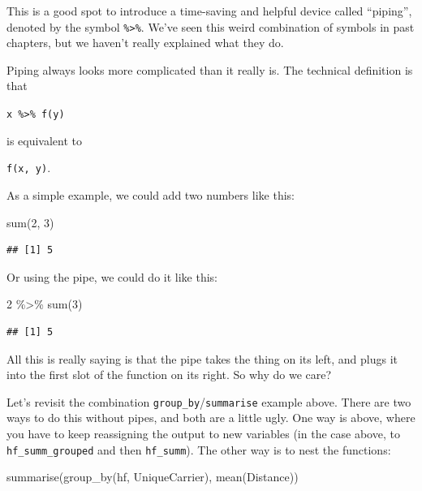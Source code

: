 \documentclass[
]{book}
\newenvironment{Shaded}{\begin{snugshade}}{\end{snugshade}}
\newcommand{\DecValTok}[1]{\textcolor[rgb]{0.00,0.00,0.81}{#1}}
\newcommand{\FunctionTok}[1]{\textcolor[rgb]{0.00,0.00,0.00}{#1}}
\newcommand{\NormalTok}[1]{#1}
\newcommand{\SpecialCharTok}[1]{\textcolor[rgb]{0.00,0.00,0.00}{#1}}
\begin{document}
This is a good spot to introduce a time-saving and helpful device called ``piping'', denoted by the symbol \texttt{\%\textgreater{}\%}. We've seen this weird combination of symbols in past chapters, but we haven't really explained what they do.

Piping always looks more complicated than it really is. The technical definition is that

\texttt{x\ \%\textgreater{}\%\ f(y)}

is equivalent to

\texttt{f(x,\ y)}.

As a simple example, we could add two numbers like this:

\begin{Shaded}
\begin{Highlighting}[]
\FunctionTok{sum}\NormalTok{(}\DecValTok{2}\NormalTok{, }\DecValTok{3}\NormalTok{)}
\end{Highlighting}
\end{Shaded}

\begin{verbatim}
## [1] 5
\end{verbatim}

Or using the pipe, we could do it like this:

\begin{Shaded}
\begin{Highlighting}[]
\DecValTok{2} \SpecialCharTok{\%\textgreater{}\%} \FunctionTok{sum}\NormalTok{(}\DecValTok{3}\NormalTok{)}
\end{Highlighting}
\end{Shaded}

\begin{verbatim}
## [1] 5
\end{verbatim}

All this is really saying is that the pipe takes the thing on its left, and plugs it into the first slot of the function on its right. So why do we care?

Let's revisit the combination \texttt{group\_by}/\texttt{summarise} example above. There are two ways to do this without pipes, and both are a little ugly. One way is above, where you have to keep reassigning the output to new variables (in the case above, to \texttt{hf\_summ\_grouped} and then \texttt{hf\_summ}). The other way is to nest the functions:

\begin{Shaded}
\begin{Highlighting}[]
\FunctionTok{summarise}\NormalTok{(}\FunctionTok{group\_by}\NormalTok{(hf, UniqueCarrier), }\FunctionTok{mean}\NormalTok{(Distance))}
\end{Highlighting}
\end{Shaded}
\end{document}
